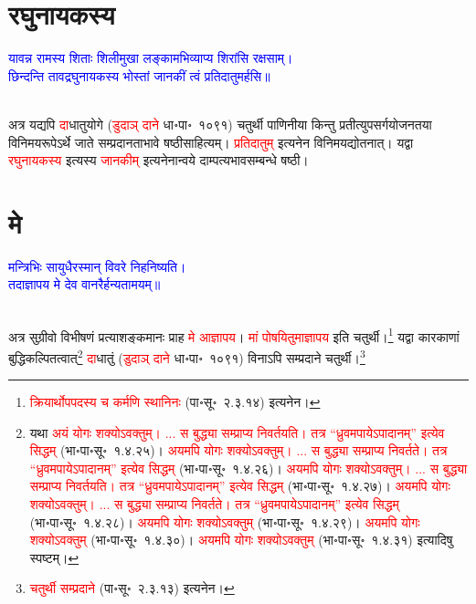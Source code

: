 \section[रघुनायकस्य]{रघुनायकस्य}
\centering\textcolor{blue}{यावन्न रामस्य शिताः शिलीमुखा लङ्कामभिव्याप्य शिरांसि रक्षसाम्।\nopagebreak\\
छिन्दन्ति तावद्रघुनायकस्य भोस्तां जानकीं त्वं प्रतिदातुमर्हसि॥}\nopagebreak\\
\\
\begin{sloppypar}\justifying\noindent\hspace{10mm} अत्र यद्यपि \textcolor{red}{दा}\-धातु\-योगे (\textcolor{red}{डुदाञ् दाने} धा॰पा॰~१०९१) चतुर्थी पाणिनीया किन्तु प्रतीत्युपसर्ग\-योजनतया विनिमय\-रूपेऽर्थे जाते सम्प्रदानताभावे षष्ठी\-साहित्यम्। \textcolor{red}{प्रतिदातुम्‌} इत्यनेन विनिमय\-द्योतनात्। यद्वा \textcolor{red}{रघुनायकस्य} इत्यस्य \textcolor{red}{जानकीम्‌} इत्यनेनान्वये दाम्पत्य\-भाव\-सम्बन्धे षष्ठी। \end{sloppypar}
\section[मे]{मे}
\centering\textcolor{blue}{मन्त्रिभिः सायुधैरस्मान् विवरे निहनिष्यति।\nopagebreak\\
तदाज्ञापय मे देव वानरैर्हन्यतामयम्॥}\nopagebreak\\
\\
\begin{sloppypar}\justifying\noindent\hspace{10mm} अत्र सुग्रीवो विभीषणं प्रत्याशङ्कमानः प्राह \textcolor{red}{मे आज्ञापय}। \textcolor{red}{मां पोषयितुमाज्ञापय} इति चतुर्थी।\footnote{\textcolor{red}{क्रियार्थोपपदस्य च कर्मणि स्थानिनः} (पा॰सू॰~२.३.१४) इत्यनेन।} यद्वा कारकाणां बुद्धि\-कल्पितत्वात्\footnote{यथा \textcolor{red}{अयं योगः शक्योऽवक्तुम्। ... स बुद्ध्या सम्प्राप्य निवर्तयति। तत्र “ध्रुवमपायेऽपादानम्” इत्येव सिद्धम्‌} (भा॰पा॰सू॰~१.४.२५)। \textcolor{red}{अयमपि योगः शक्योऽवक्तुम्। ... स बुद्ध्या सम्प्राप्य निवर्तते। तत्र “ध्रुवमपायेऽपादानम्” इत्येव सिद्धम्‌} (भा॰पा॰सू॰~१.४.२६)। \textcolor{red}{अयमपि योगः शक्योऽवक्तुम्। ... स बुद्ध्या सम्प्राप्य निवर्तयति। तत्र “ध्रुवमपायेऽपादानम्” इत्येव सिद्धम्‌} (भा॰पा॰सू॰~१.४.२७)। \textcolor{red}{अयमपि योगः शक्योऽवक्तुम्। ... स बुद्ध्या सम्प्राप्य निवर्तते। तत्र “ध्रुवमपायेऽपादानम्” इत्येव सिद्धम्‌} (भा॰पा॰सू॰~१.४.२८)। \textcolor{red}{अयमपि योगः शक्योऽवक्तुम्‌} (भा॰पा॰सू॰~१.४.२९)। \textcolor{red}{अयमपि योगः शक्योऽवक्तुम्‌} (भा॰पा॰सू॰~१.४.३०)। \textcolor{red}{अयमपि योगः शक्योऽवक्तुम्‌} (भा॰पा॰सू॰~१.४.३१) इत्यादिषु स्पष्टम्।} \textcolor{red}{दा}\-धातुं (\textcolor{red}{डुदाञ् दाने} धा॰पा॰~१०९१) विनाऽपि सम्प्रदाने चतुर्थी।\footnote{\textcolor{red}{चतुर्थी सम्प्रदाने} (पा॰सू॰~२.३.१३) इत्यनेन।}\end{sloppypar}
